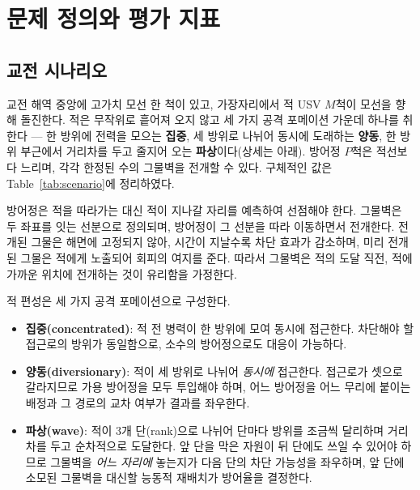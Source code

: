 \section{문제 정의와 평가 지표}
\label{sec:problem}

\subsection{교전 시나리오}
\label{sec:scenario}

교전 해역 중앙에 고가치 모선 한 척이 있고, 가장자리에서 적 USV $M$척이 모선을 향해
돌진한다. 적은 무작위로 흩어져 오지 않고 세 가지 공격 포메이션 가운데 하나를 취한다 ---
한 방위에 전력을 모으는 \textbf{집중}, 세 방위로 나뉘어 동시에 도래하는 \textbf{양동},
한 방위 부근에서 거리차를 두고 줄지어 오는 \textbf{파상}이다(상세는 아래). 방어정 $P$척은
적선보다 느리며, 각각 한정된 수의 그물벽을 전개할 수 있다. 구체적인 값은
Table~\ref{tab:scenario}에 정리하였다.




방어정은 적을 따라가는 대신 적이 지나갈 자리를 예측하여 선점해야 한다. 그물벽은 두
좌표를 잇는 선분으로 정의되며, 방어정이 그 선분을 따라 이동하면서 전개한다. 전개된 그물은
해면에 고정되지 않아, 시간이 지날수록 차단 효과가 감소하며, 미리 전개된
그물은 적에게 노출되어 회피의 여지를 준다. 따라서 그물벽은 적의 도달 직전, 적에
가까운 위치에 전개하는 것이 유리함을 가정한다.


적 편성은 세 가지 공격 포메이션으로 구성한다.
\begin{itemize}[leftmargin=*, itemsep=3pt, topsep=3pt]
\item \textbf{집중(concentrated)}: 적 전 병력이 한 방위에 모여 동시에 접근한다. 차단해야
      할 접근로의 방위가 동일함으로, 소수의 방어정으로도 대응이 가능하다.
\item \textbf{양동(diversionary)}: 적이 세 방위로 나뉘어 \emph{동시에} 접근한다. 접근로가
      셋으로 갈라지므로 가용 방어정을 모두 투입해야 하며, 어느 방어정을 어느 무리에 붙이는
      배정과 그 경로의 교차 여부가 결과를 좌우한다.
\item \textbf{파상(wave)}: 적이 3개 단(rank)으로 나뉘어 단마다 방위를 조금씩 달리하며
      거리차를 두고 순차적으로 도달한다. 앞 단을 막은 자원이 뒤 단에도 쓰일 수 있어야 하므로 그물벽을 \emph{어느
      자리에} 놓는지가 다음 단의 차단 가능성을 좌우하며, 앞 단에 소모된 그물벽을 대신할
      능동적 재배치가 방어율을 결정한다.
\end{itemize}


